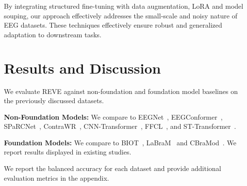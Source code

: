 \documentclass{article}
\begin{document}
By integrating structured fine-tuning with data augmentation, LoRA and model souping, our approach effectively addresses the small-scale and noisy nature of EEG datasets. These techniques effectively ensure robust and generalized adaptation to downstream tasks.

\section{Results and Discussion}

We evaluate REVE against non-foundation and foundation model baselines on the previously discussed datasets.

\textbf{Non-Foundation Models:} We compare to EEGNet~\citep{lawhern2018eegnet}, EEGConformer~\citep{song2022eeg}, SPaRCNet~\citep{jing2023development}, ContraWR~\citep{yang2021self}, CNN-Transformer~\citep{peh2022transformer}, FFCL~\citep{li2022motor}, and ST-Transformer~\citep{song2021transformer}.

\textbf{Foundation Models:} We compare to BIOT~\citep{yang2024biot}, LaBraM~\citep{jiang2024labram} and CBraMod~\citep{wang2024cbramod}. We report results displayed in existing studies.


We report the balanced accuracy for each dataset and provide additional evaluation metrics in the appendix.
\end{document}
